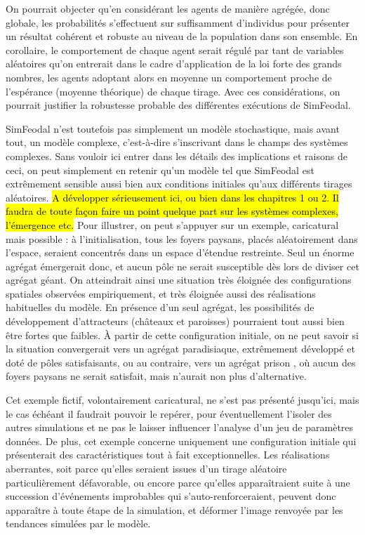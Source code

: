 	On pourrait objecter qu'en considérant les agents de manière agrégée, donc globale, les probabilités s'effectuent sur suffisamment d'individus pour présenter un résultat cohérent et robuste au niveau de la population dans son ensemble.
	En corollaire, le comportement de chaque agent serait régulé par tant de variables aléatoires qu'on entrerait dans le cadre d'application de la loi forte des grands nombres, les agents adoptant alors en moyenne un comportement proche de l'espérance (moyenne théorique) de chaque tirage.
	Avec ces considérations, on pourrait justifier la robustesse probable des différentes exécutions de SimFeodal.

	SimFeodal n'est toutefois pas simplement un modèle stochastique, mais avant tout, un modèle complexe, c'est-à-dire s'inscrivant dans le champs des systèmes complexes. Sans vouloir ici entrer dans les détails des implications et raisons de ceci, on peut simplement en retenir qu'un modèle tel que SimFeodal est extrêmement sensible aussi bien aux conditions initiales qu'aux différents tirages aléatoires.
	\hl{A développer sérieusement ici, ou bien dans les chapitres 1 ou 2. Il faudra de toute façon faire un point quelque part sur les systèmes complexes, l'émergence etc.}
	Pour illustrer, on peut s'appuyer sur un exemple, caricatural mais possible : à l'initialisation, tous les foyers paysans, placés aléatoirement dans l'espace, seraient concentrés dans un espace d'étendue restreinte.
	Seul un énorme agrégat émergerait donc, et aucun pôle ne serait susceptible dès lors de diviser cet agrégat géant.
	On atteindrait ainsi une situation très éloignée des configurations spatiales observées empiriquement, et très éloignée aussi des réalisations habituelles du modèle.
	En présence d'un seul agrégat, les possibilités de développement d'attracteurs (châteaux et paroisses) pourraient tout aussi bien être fortes que faibles.
	À partir de cette configuration initiale, on ne peut savoir si la situation convergerait vers un agrégat \og paradisiaque\fg{}, extrêmement développé et doté de pôles satisfaisants, ou au contraire, vers un agrégat \og prison \fg{}, où aucun des foyers paysans ne serait satisfait, mais n'aurait non plus d'alternative.
	
	Cet exemple fictif, volontairement caricatural, ne s'est pas présenté jusqu'ici, mais le cas échéant il faudrait pouvoir le repérer, pour éventuellement l'isoler des autres simulations et ne pas le laisser influencer l'analyse d'un jeu de paramètres données.
	De plus, cet exemple concerne uniquement une configuration initiale qui présenterait des caractéristiques tout à fait exceptionnelles.
	Les réalisations aberrantes, soit parce qu'elles seraient issues d'un tirage aléatoire particulièrement défavorable, ou encore parce qu'elles apparaîtraient suite à une succession d'événements improbables qui s'auto-renforceraient, peuvent donc apparaître à toute étape de la simulation, et déformer l'image renvoyée par les tendances simulées par le modèle.
	
